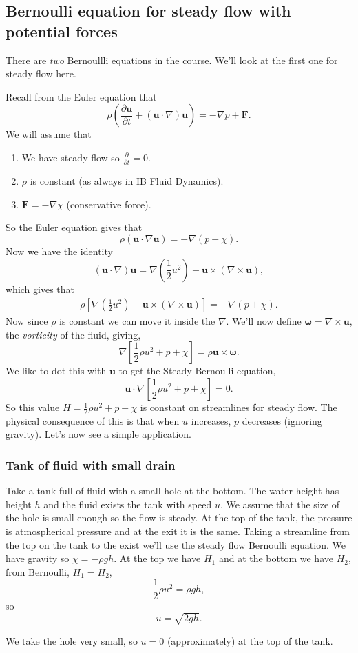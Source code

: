 \documentclass{article}
\begin{document}
\subsection{Bernoulli equation for steady flow with potential forces}
There are \textit{two} Bernoullli equations in the course. We'll look at the first one for steady flow here.\par
Recall from the Euler equation that
\[
	\rho\left(\frac{\partial\mathbf u}{\partial t} + (\mathbf u \cdot\nabla)\mathbf u\right) = -\nabla p+ \mathbf F.
\]
We will assume that
\begin{enumerate}
	\item We have steady flow so $ \frac{\partial}{\partial t}= 0 $.
	\item $ \rho $ is constant (as always in IB Fluid Dynamics).
	\item $ \mathbf F = - \nabla \chi $ (conservative force).
\end{enumerate}
So the Euler equation gives that
\[
  \rho(\mathbf u \cdot \nabla \mathbf u) = -\nabla(p+\chi).
\]
Now we have the identity
\[
	(\mathbf u\cdot \nabla)\mathbf u = \nabla\left(\frac 12 u^2\right) -\mathbf u \times(\nabla\times \mathbf u),
\]
which gives that 
\begin{align*}
	\rho\left[\nabla\left(\frac 12 u^2\right)-\mathbf u\times(\nabla\times \mathbf u)\right] = -\nabla(p+\chi).
\end{align*}
Now since $ \rho $ is constant we can move it inside the $ \nabla $. We'll now define $ \boldsymbol\omega = \nabla\times \mathbf u $, the \textit{vorticity} of the fluid, giving,
\[
	\nabla\left[\frac 12 \rho u^2+p+\chi\right]= \rho\mathbf u\times \boldsymbol\omega.
\]
We like to dot this with $ \mathbf u $ to get the Steady Bernoulli equation,
\[
\mathbf u \cdot\nabla\left[\frac 12 \rho u^2 + p+\chi\right]=0.
\]
So this value $ H = \frac 12 \rho u^2 + p +\chi $ is constant on streamlines for steady flow. The physical consequence of this is that when $ u $ increases, $ p $ decreases (ignoring gravity). Let's now see a simple application.
\subsubsection{Tank of fluid with small drain}
Take a tank full of fluid with a small hole at the bottom. The water height has height $ h $ and the fluid exists the tank with speed $ u $. We assume that the size of the hole is small enough so the flow is steady. At the top of the tank, the pressure is atmospherical pressure and at the exit it is the same. Taking a streamline from the top on the tank to the exist we'll use the steady flow Bernoulli equation. We have gravity so $ \chi = - \rho gh $. At the top we have $ H_1 $ and at the bottom we have $ H_2 $, from Bernoulli, $ H_1=H_2 $,
\[
  \frac 12 \rho u^2 = \rho gh,
\]
so 
\[
	u=\sqrt{2gh}.
\]
\begin{remark}
  We take the hole very small, so $ u=0 $ (approximately) at the top of the tank.
\end{remark}
\end{document}
